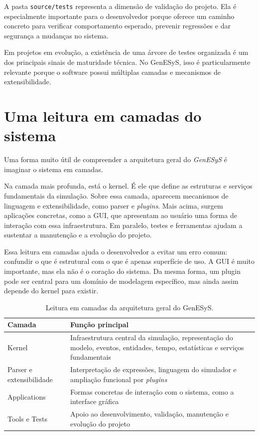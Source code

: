 A pasta \texttt{source/tests} representa a dimensão de validação do projeto. Ela é especialmente importante para o desenvolvedor porque oferece um caminho concreto para verificar comportamento esperado, prevenir regressões e dar segurança a mudanças no sistema.

Em projetos em evolução, a existência de uma árvore de testes organizada é um dos principais sinais de maturidade técnica. No GenESyS, isso é particularmente relevante porque o software possui múltiplas camadas e mecanismos de extensibilidade.

\section{Uma leitura em camadas do sistema}
\label{sec:cap6_leitura_em_camadas}

Uma forma muito útil de compreender a arquitetura geral do \textit{GenESyS} é imaginar o sistema em camadas.

Na camada mais profunda, está o kernel. É ele que define as estruturas e serviços fundamentais da simulação. Sobre essa camada, aparecem mecanismos de linguagem e extensibilidade, como parser e \textit{plugins}. Mais acima, surgem aplicações concretas, como a GUI, que apresentam ao usuário uma forma de interação com essa infraestrutura. Em paralelo, testes e ferramentas ajudam a sustentar a manutenção e a evolução do projeto.

Essa leitura em camadas ajuda o desenvolvedor a evitar um erro comum: confundir o que é estrutural com o que é apenas superfície de uso. A GUI é muito importante, mas ela não é o coração do sistema. Da mesma forma, um plugin pode ser central para um domínio de modelagem específico, mas ainda assim depende do kernel para existir.

\begin{table}[htbp]
    \centering
    \caption{Leitura em camadas da arquitetura geral do GenESyS.}
    \label{tab:cap6_leitura_em_camadas}
    \small
    \begin{tabular}{|p{3.3cm}|p{7.8cm}|}
        \hline
        \textbf{Camada} & \textbf{Função principal} \\
        \hline
        Kernel & Infraestrutura central da simulação, representação do modelo, eventos, entidades, tempo, estatísticas e serviços fundamentais \\
        \hline
        Parser e extensibilidade & Interpretação de expressões, linguagem do simulador e ampliação funcional por \textit{plugins} \\
        \hline
        Applications & Formas concretas de interação com o sistema, como a interface gráfica \\
        \hline
        Tools e Tests & Apoio ao desenvolvimento, validação, manutenção e evolução do projeto \\
        \hline
    \end{tabular}
\end{table}


